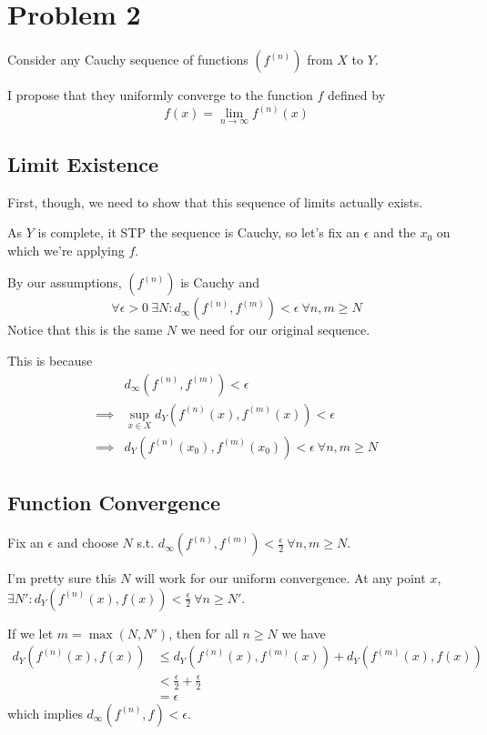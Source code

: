 \documentclass[12pt]{article}
\begin{document}
\setcounter{section}{1}

\section{Problem 2}\label{sec:p2}

Consider any Cauchy sequence of functions $\left(f^{(n)}\right)$ from $X$ to $Y$.

I propose that they uniformly converge to the function $f$ defined by
\[f(x)=\lim_{n \to \infty} f^{(n)}(x)\]

\subsection{Limit Existence}

First, though, we need to show that this sequence of limits actually exists.

As $Y$ is complete, it STP the sequence is Cauchy, so let's fix an $\epsilon$ and
the $x_0$ on which we're applying $f$.

By our assumptions, $\left(f^{(n)}\right)$ is Cauchy and
\[\forall \epsilon > 0\ \exists N: d_\infty\left(f^{(n)}, f^{(m)}\right) < \epsilon\ \forall n, m \ge N\]
Notice that this is the same $N$ we need for our original sequence.

This is because
\begin{align*}
    & d_\infty\left(f^{(n)}, f^{(m)}\right) < \epsilon \\
    \implies{} & \sup_{x \in X} d_Y\left(f^{(n)}(x), f^{(m)}(x)\right) < \epsilon \\
    \implies{} & d_Y\left(f^{(n)}(x_0), f^{(m)}(x_0)\right) < \epsilon\ \forall n, m \ge N
\end{align*}

\subsection{Function Convergence}

Fix an $\epsilon$ and choose $N$ s.t.
$d_\infty\left(f^{(n)}, f^{(m)}\right) < \frac{\epsilon}{2}\ \forall n, m \ge N$.

I'm pretty sure this $N$ will work for our uniform convergence.
At any point $x$, $\exists N': d_Y\left(f^{(n)}(x), f(x)\right) < \frac{\epsilon}{2}\ \forall n \ge N'$.

If we let $m=\max(N, N')$, then for all $n \ge N$ we have
\begin{align*}
    d_Y\left(f^{(n)}(x), f(x)\right)
    &\le d_Y\left(f^{(n)}(x), f^{(m)}(x)\right) + d_Y\left(f^{(m)}(x), f(x)\right) \\
    &< \frac{\epsilon}{2} + \frac{\epsilon}{2} \\
    &= \epsilon
\end{align*}
which implies $d_\infty\left(f^{(n)}, f\right) < \epsilon$.
\end{document}
